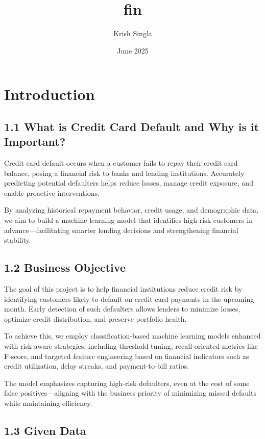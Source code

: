 \documentclass{article}
\title{fin}
\author{Krish Singla}
\date{June 2025}
\begin{document}
\maketitle

\section{Introduction}
\subsection*{1.1 What is Credit Card Default and Why is it Important?}

Credit card default occurs when a customer fails to repay their credit card balance, posing a financial risk to banks and lending institutions. Accurately predicting potential defaulters helps reduce losses, manage credit exposure, and enable proactive interventions. 

By analyzing historical repayment behavior, credit usage, and demographic data, we aim to build a machine learning model that identifies high-risk customers in advance—facilitating smarter lending decisions and strengthening financial stability.


\subsection*{1.2 Business Objective}

The goal of this project is to help financial institutions reduce credit risk by identifying customers likely to default on credit card payments in the upcoming month. Early detection of such defaulters allows lenders to minimize losses, optimize credit distribution, and preserve portfolio health.

To achieve this, we employ classification-based machine learning models enhanced with risk-aware strategies, including threshold tuning, recall-oriented metrics like F-score, and targeted feature engineering based on financial indicators such as credit utilization, delay streaks, and payment-to-bill ratios.

The model emphasizes capturing high-risk defaulters, even at the cost of some false positives---aligning with the business priority of minimizing missed defaults while maintaining efficiency.


\subsection*{1.3 Given Data}
\end{document}
